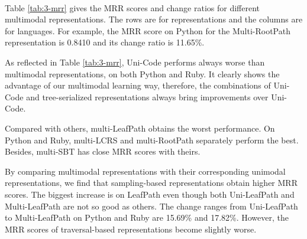 \documentclass[conference]{IEEEtran}
\begin{document}
\begin{table}[thb]
\centering
\caption{MRR Scores of Multimodal Representations}
~\\
\label{tab:3-mrr}
\end{table}
 Table \ref{tab:3-mrr} gives the MRR scores and change ratios for different multimodal representations. The rows are for representations and the columns are for languages. For example, the MRR score on Python for the Multi-RootPath representation is 0.8410 and its change ratio is 11.65\%.

As reflected in Table \ref{tab:3-mrr}, Uni-Code performs always worse than multimodal representations, on both Python and Ruby. It clearly shows the advantage of our multimodal learning way, therefore, the combinations of Uni-Code and tree-serialized representations always bring improvements over Uni-Code.

Compared with others, multi-LeafPath obtains the worst performance. On Python and Ruby, multi-LCRS and multi-RootPath separately perform the best. Besides, multi-SBT has close MRR scores with theirs.

By comparing multimodal representations with their corresponding unimodal representations, we find that sampling-based representations obtain higher MRR scores. The biggest increase is on LeafPath even though both Uni-LeafPath and Multi-LeafPath are not so good as others. The change ranges from Uni-LeafPath to Multi-LeafPath on Python and Ruby are 15.69\% and 17.82\%. However, the MRR scores of traversal-based representations become slightly worse.
\end{document}
